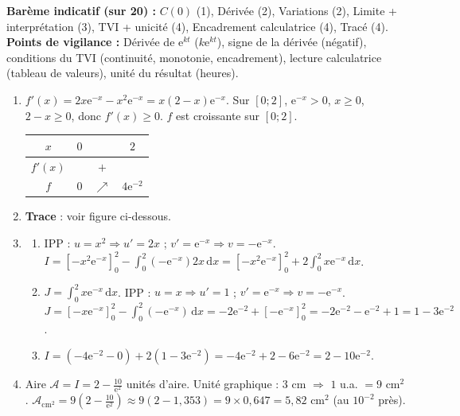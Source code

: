 \documentclass[11pt]{article}
\begin{document}
\begin{corrige}
\textbf{Barème indicatif (sur 20) :} $C(0)$ (1), Dérivée (2), Variations (2), Limite + interprétation (3), TVI + unicité (4), Encadrement calculatrice (4), Tracé (4).
\textbf{Points de vigilance :} Dérivée de $\mathrm{e}^{kt}$ ($k\mathrm{e}^{kt}$), signe de la dérivée (négatif), conditions du TVI (continuité, monotonie, encadrement), lecture calculatrice (tableau de valeurs), unité du résultat (heures).
\end{corrige}

\begin{corrige}
\begin{enumerate}
\item $f'(x)=2x\mathrm{e}^{-x}-x^{2}\mathrm{e}^{-x}=x(2-x)\mathrm{e}^{-x}$.
  Sur $[0;2]$, $\mathrm{e}^{-x}>0$, $x\ge 0$, $2-x\ge 0$, donc $f'(x)\ge 0$.
  $f$ est croissante sur $[0;2]$.
  \begin{center}
  \begin{tabular}{|c|ccc|}\hline
  $x$ & $0$ & & $2$ \\ \hline
  $f'(x)$ & & $+$ & \\ \hline
  $f$ & $0$ & $\nearrow$ & $4\mathrm{e}^{-2}$ \\ \hline
  \end{tabular}
  \end{center}
\item \textbf{Trace} : voir figure ci-dessous.
\item \begin{enumerate}
\item IPP : $u=x^2 \Rightarrow u'=2x$ ; $v'=\mathrm{e}^{-x} \Rightarrow v=-\mathrm{e}^{-x}$.
  $I = \left[-x^2\mathrm{e}^{-x}\right]_0^2 - \int_0^2 (-\mathrm{e}^{-x})2x\,\mathrm{d}x = \left[-x^2\mathrm{e}^{-x}\right]_0^2 + 2\int_0^2 x\mathrm{e}^{-x}\,\mathrm{d}x$.
\item $J = \int_0^2 x\mathrm{e}^{-x}\,\mathrm{d}x$.
  IPP : $u=x \Rightarrow u'=1$ ; $v'=\mathrm{e}^{-x} \Rightarrow v=-\mathrm{e}^{-x}$.
  $J = \left[-x\mathrm{e}^{-x}\right]_0^2 - \int_0^2 (-\mathrm{e}^{-x})\,\mathrm{d}x = -2\mathrm{e}^{-2} + \left[-\mathrm{e}^{-x}\right]_0^2 = -2\mathrm{e}^{-2} -\mathrm{e}^{-2} + 1 = 1 - 3\mathrm{e}^{-2}$.
\item $I = \left(-4\mathrm{e}^{-2} - 0\right) + 2\left(1 - 3\mathrm{e}^{-2}\right) = -4\mathrm{e}^{-2} + 2 - 6\mathrm{e}^{-2} = \boxed{2 - 10\mathrm{e}^{-2}}$.
\end{enumerate}
\item Aire $\mathcal{A} = I = 2 - \frac{10}{\mathrm{e}^2}$ unités d'aire.
  Unité graphique : $3$ cm $\Rightarrow$ $1$ u.a. $= 9$ cm$^2$.
  $\mathcal{A}_{\text{cm}^2} = 9\left(2 - \frac{10}{\mathrm{e}^2}\right) \approx 9(2 - 1{,}353) = 9 \times 0{,}647 = \boxed{5{,}82 \text{ cm}^2}$ (au $10^{-2}$ près).
\end{enumerate}


\end{corrige}
\end{document}
